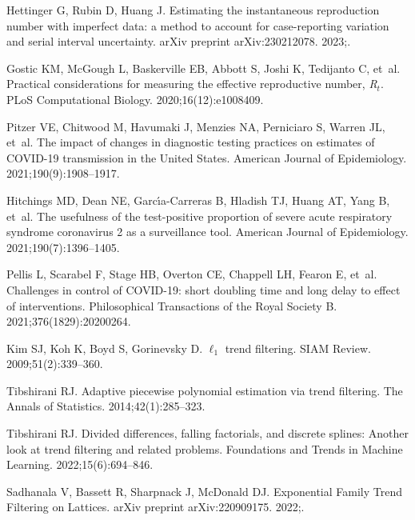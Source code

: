\documentclass[10pt,letterpaper]{article}
\begin{document}
\begin{thebibliography}{10}
  Hettinger G, Rubin D, Huang J.
  \newblock Estimating the instantaneous reproduction number with imperfect data:
    a method to account for case-reporting variation and serial interval
    uncertainty.
  \newblock arXiv preprint arXiv:230212078. 2023;.
  
  Gostic KM, McGough L, Baskerville EB, Abbott S, Joshi K, Tedijanto C, et~al.
  \newblock Practical considerations for measuring the effective reproductive
    number, \emph{R}$_t$.
  \newblock PLoS Computational Biology. 2020;16(12):e1008409.
  
  Pitzer VE, Chitwood M, Havumaki J, Menzies NA, Perniciaro S, Warren JL, et~al.
  \newblock The impact of changes in diagnostic testing practices on estimates of
    {COVID-19} transmission in the {U}nited {S}tates.
  \newblock American Journal of Epidemiology. 2021;190(9):1908--1917.
  
  Hitchings MD, Dean NE, Garc{\'\i}a-Carreras B, Hladish TJ, Huang AT, Yang B,
    et~al.
  \newblock The usefulness of the test-positive proportion of severe acute
    respiratory syndrome coronavirus 2 as a surveillance tool.
  \newblock American Journal of Epidemiology. 2021;190(7):1396--1405.
  
  Pellis L, Scarabel F, Stage HB, Overton CE, Chappell LH, Fearon E, et~al.
  \newblock Challenges in control of {COVID-19}: short doubling time and long
    delay to effect of interventions.
  \newblock Philosophical Transactions of the Royal Society B.
    2021;376(1829):20200264.
  
  Kim SJ, Koh K, Boyd S, Gorinevsky D.
  \newblock $\ell_1$ trend filtering.
  \newblock SIAM Review. 2009;51(2):339--360.
  
  Tibshirani RJ.
  \newblock Adaptive piecewise polynomial estimation via trend filtering.
  \newblock The Annals of Statistics. 2014;42(1):285--323.
  
  Tibshirani RJ.
  \newblock Divided differences, falling factorials, and discrete splines:
    Another look at trend filtering and related problems.
  \newblock Foundations and Trends{\textregistered} in Machine Learning.
    2022;15(6):694--846.
  
  Sadhanala V, Bassett R, Sharpnack J, McDonald DJ.
  \newblock Exponential Family Trend Filtering on Lattices.
  \newblock arXiv preprint arXiv:220909175. 2022;.
  

\end{thebibliography}
\end{document}
